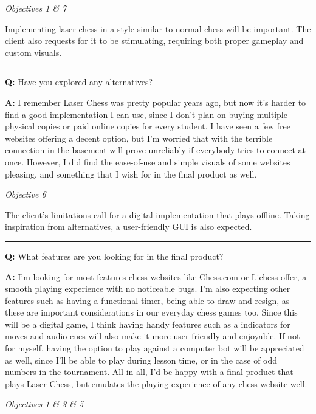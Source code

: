 \documentclass[../main/main.tex]{subfiles}
\begin{document}
\bigskip

\noindent\textit{Objectives 1 \& 7}

\noindent Implementing laser chess in a style similar to normal chess will be important. The client also requests for it to be stimulating, requiring both proper gameplay and custom visuals.

\noindent\rule{\textwidth}{0.4pt}

\noindent\textbf{Q:} Have you explored any alternatives?

\noindent\textbf{A:} I remember Laser Chess was pretty popular years ago, but now it’s harder to find a good implementation I can use, since I don’t plan on buying multiple physical copies or paid online copies for every student. I have seen a few free websites offering a decent option, but I’m worried that with the terrible connection in the basement will prove unreliably if everybody tries to connect at once. However, I did find the ease-of-use and simple visuals of some websites pleasing, and something that I wish for in the final product as well.

\bigskip

\noindent\textit{Objective 6}

\noindent The client’s limitations call for a digital implementation that plays offline. Taking inspiration from alternatives, a user-friendly GUI is also expected.

\noindent\rule{\textwidth}{0.4pt}

\noindent\textbf{Q:} What features are you looking for in the final product?

\noindent\textbf{A:} I’m looking for most features chess websites like Chess.com or Lichess offer, a smooth playing experience with no noticeable bugs. I’m also expecting other features such as having a functional timer, being able to draw and resign, as these are important considerations in our everyday chess games too. Since this will be a digital game, I think having handy features such as a indicators for moves and audio cues will also make it more user-friendly and enjoyable. If not for myself, having the option to play against a computer bot will be appreciated as well, since I’ll be able to play during lesson time, or in the case of odd numbers in the tournament. All in all, I’d be happy with a final product that plays Laser Chess, but emulates the playing experience of any chess website well.

\bigskip

\noindent\textit{Objectives 1 \& 3 \& 5}
\end{document}
